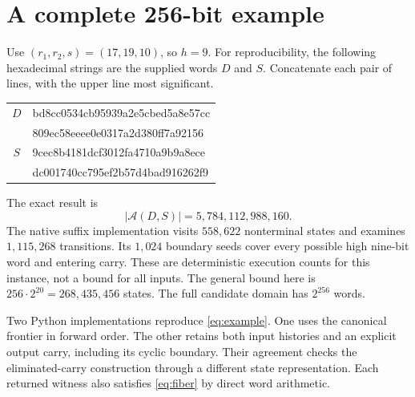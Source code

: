 \documentclass[11pt,a4paper]{article}
\theoremstyle{definition}\newtheorem{definition}[theorem]{Definition}
\begin{document}
\section{A complete 256-bit example}
Use $(r_1,r_2,s)=(17,19,10)$, so $h=9$.
For reproducibility, the following hexadecimal strings are the supplied words
$D$ and $S$. Concatenate each pair of lines, with the upper line most significant.
\begin{center}\small\ttfamily
\begin{tabular}{cl}
$D$ & bd8cc0534cb95939a2e5cbed5a8e57cc\\[-1pt]
    & 809ec58eeee0e0317a2d380ff7a92156\\[3pt]
$S$ & 9cec8b4181dcf3012fa4710a9b9a8ece\\[-1pt]
    & dc001740cc795ef2b57d4bad916262f9
\end{tabular}
\end{center}
The exact result is
\begin{equation}\label{eq:example}
 |\mathcal A(D,S)|=5{,}784{,}112{,}988{,}160.
\end{equation}
The native suffix implementation visits $558{,}622$ nonterminal states and
examines $1{,}115{,}268$ transitions. Its $1{,}024$ boundary seeds cover every
possible high nine-bit word and entering carry. These are deterministic
execution counts for this instance, not a bound for all inputs.
The general bound here is $256\cdot2^{20}=268{,}435{,}456$ states.
The full candidate domain has $2^{256}$ words.

Two Python implementations reproduce \eqref{eq:example}. One uses the canonical
frontier in forward order. The other retains both input histories and an
explicit output carry, including its cyclic boundary. Their agreement checks
the eliminated-carry construction through a different state representation.
Each returned witness also satisfies \eqref{eq:fiber} by direct word arithmetic.
\end{document}
